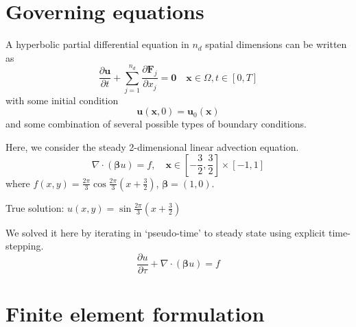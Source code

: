 \documentclass[11pt]{beamer}
\let\bld\boldsymbol
\begin{document}
\section{Governing equations}
\begin{frame}
A hyperbolic partial differential equation in $n_d$ spatial dimensions can be written as
\begin{equation}
\frac{\partial \bld{u}}{\partial t} + \sum_{j=1}^{n_d} \frac{\partial \bld{F}_j}{\partial x_j} = \bld{0} \quad \bld{x} \in \Omega, t \in [0,T]
\label{conservativeGE}
\end{equation}
with some initial condition
\begin{equation}
\bld{u}(\bld{x},0) = \bld{u}_0(\bld{x})
\end{equation}
and some combination of several possible types of boundary conditions.
\end{frame}
\begin{frame}
Here, we consider the steady 2-dimensional linear advection equation.
\begin{equation}
\nabla\cdot(\bld{\beta}u) = f, \quad \bld{x} \in [-\frac32,\frac32]\times[-1,1]
\end{equation}
where $f(x,y) = \frac{2\pi}{3}\cos\frac{2\pi}{3}(x+\frac32)$, $\bld{\beta} = (1,0)$.

True solution: $u(x,y) = \sin\frac{2\pi}{3}(x+\frac32)$

We solved it here by iterating in `pseudo-time' to steady state using explicit time-stepping.
\begin{equation}
\frac{\partial u}{\partial \tau} + \nabla\cdot(\bld{\beta}u) = f
\end{equation}
\end{frame}

\section{Finite element formulation}
\end{document}

